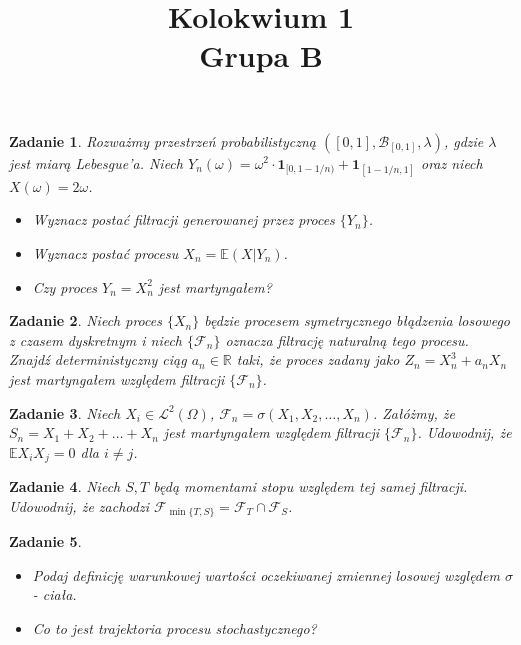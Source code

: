\documentclass{mwart}
\title{Kolokwium 1\\Grupa B}
\newtheorem{zd}{Zadanie}
\begin{document}

\maketitle
\begin{zd}
Rozważmy przestrzeń probabilistyczną $\left([0, 1], \mathcal{B}_{[0, 1]}, \lambda \right)$, gdzie $\lambda$ jest miarą Lebesgue'a. Niech $Y_n(\omega) = \omega^2\cdot \pmb{1}_{[0, 1 - 1/n)} + \pmb{1}_{[1-1/n, 1]}$ oraz niech $X(\omega) = 2\omega$.
\begin{itemize}
\item Wyznacz postać filtracji generowanej przez proces $\{Y_n\}$.
\item Wyznacz postać procesu $X_n = \mathbb{E}\left(X|Y_n\right)$.
\item Czy proces $Y_n = X_n^2$ jest martyngałem?
\end{itemize}
\end{zd}
\begin{zd}
Niech proces $\{X_n\}$ będzie procesem symetrycznego błądzenia losowego z czasem dyskretnym i niech $\{\mathcal{F}_n\}$ oznacza filtrację naturalną tego procesu. Znajdź deterministyczny ciąg $a_n\in \mathbb{R}$ taki, że proces zadany jako $Z_n = X_n^3 + a_nX_n$ jest martyngałem względem filtracji $\{\mathcal{F}_n\}$.
\end{zd}
\begin{zd}
Niech $X_i\in \mathcal{L}^2\left(\Omega\right)$, $\mathcal{F}_n = \sigma\left(X_1, X_2, \dots, X_n\right)$. Załóżmy, że $S_n = X_1 + X_2 + \dots + X_n$ jest martyngałem względem filtracji $\{\mathcal{F}_n\}$. Udowodnij, że $\mathbb{E}X_iX_j = 0$ dla $i\neq j$.
\end{zd}
\begin{zd}
Niech $S, T$ będą momentami stopu względem tej samej filtracji. Udowodnij, że zachodzi $\mathcal{F}_{\min\{T,S\}} = \mathcal{F}_{T} \cap \mathcal{F}_{S}$.
\end{zd}
\begin{zd}
\begin{itemize}
\item Podaj definicję warunkowej wartości oczekiwanej zmiennej losowej względem $\sigma$- ciała.
\item Co to jest trajektoria procesu stochastycznego?
\end{itemize}
\end{zd}
\end{document}

